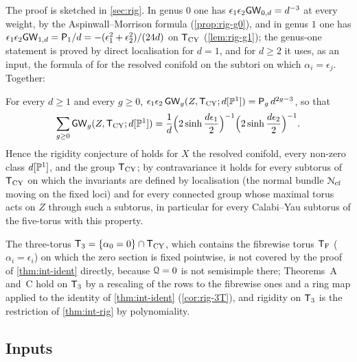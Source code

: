 The proof is sketched in \cref{sec:rig}. In genus $0$ one has $\epsilon_1\epsilon_2\mathsf{GW}_{0,d}=d^{-3}$ at every weight, by the Aspinwall--Morrison formula (\cref{prop:rig-g0}), and in genus $1$ one has $\epsilon_1\epsilon_2\mathsf{GW}_{1,d}=\mathsf{P}_{1}/d=-(\epsilon_1^2+\epsilon_2^2)/(24d)$ on $\mathsf{T}_{\mathrm{CY}}$ (\cref{lem:rig-g1}); the genus-one statement is proved by direct localisation for $d=1$, and for $d\geq2$ it uses, as an input, the formula of \cite{BS} for the resolved conifold on the subtori on which $\alpha_i=\epsilon_j$. Together:

\begin{cor}
\label{cor:int-conj}
For every $d\geq1$ and every $g\geq0$, $\epsilon_1\epsilon_2\,\mathsf{GW}_g(Z,\mathsf{T}_{\mathrm{CY}};d[\mathbb{P}^1])=\mathsf{P}_{g}\,d^{2g-3}$, so that
\[
\sum_{g\geq0}\mathsf{GW}_g(Z,\mathsf{T}_{\mathrm{CY}};d[\mathbb{P}^1])=\frac1d\Big(2\sinh\frac{d\epsilon_1}2\Big)^{-1}\Big(2\sinh\frac{d\epsilon_2}2\Big)^{-1}.
\]
Hence the rigidity conjecture of \cite{BS} holds for $X$ the resolved conifold, every non-zero class $d[\mathbb{P}^1]$, and the group $\mathsf{T}_{\mathrm{CY}}$; by contravariance it holds for every subtorus of $\mathsf{T}_{\mathrm{CY}}$ on which the invariants are defined by localisation (the normal bundle $\mathcal{N}_{\mathrm{cf}}$ moving on the fixed loci) and for every connected group whose maximal torus acts on $Z$ through such a subtorus, in particular for every Calabi--Yau subtorus of the five-torus with this property.
\end{cor}

The three-torus $\mathsf{T}_{3}=\{\alpha_0=0\}\cap\mathsf{T}_{\mathrm{CY}}$, which contains the fibrewise torus $\mathsf{T}_{\mathrm{F}}$ ($\alpha_i=\epsilon_i$) on which the zero section is fixed pointwise, is not covered by the proof of \cref{thm:int-ident} directly, because $\mathcal{Q}=0$ is not semisimple there; Theorems~A and~C hold on $\mathsf{T}_{3}$ by a rescaling of the rows to the fibrewise ones and a ring map applied to the identity of \cref{thm:int-ident} (\cref{cor:rig-3T}), and rigidity on $\mathsf{T}_{3}$ is the restriction of \cref{thm:int-rig} by polynomiality.

\subsection{Inputs}
\label{sec:int-inputs}

